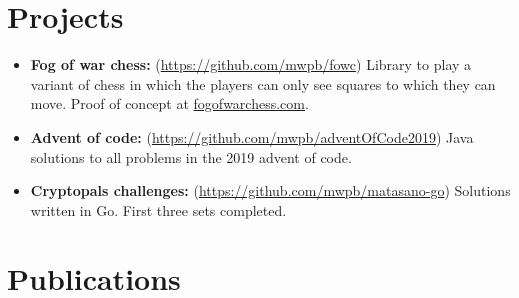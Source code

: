 \section*{Projects}
\begin{itemize}
\item \textbf{Fog of war chess:} (\url{https://github.com/mwpb/fowc}) Library to play a variant of chess in which the players can only see squares to which they can move. Proof of concept at \href{https:fogofwarchess.com}{fogofwarchess.com}.
\item \textbf{Advent of code:} (\url{https://github.com/mwpb/adventOfCode2019}) Java solutions to all problems in the 2019 advent of code.
\item \textbf{Cryptopals challenges:} (\url{https://github.com/mwpb/matasano-go}) Solutions written in Go. First three sets completed.
\end{itemize}
\section*{Publications}

